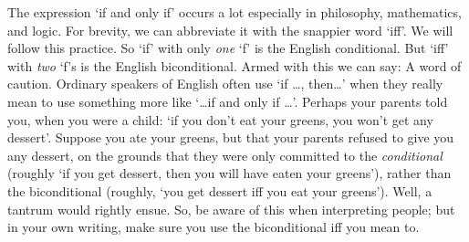 The expression `if and only if' occurs a lot especially in philosophy, mathematics, and logic. For brevity, we can abbreviate it with the snappier word `iff'. We will follow this practice. So `if' with only \emph{one} `f' is the English conditional. But `iff' with \emph{two} `f's is the English biconditional. Armed with this we can say:
A word of caution. Ordinary speakers of English often use `if \ldots, then\ldots' when they really mean to use something more like `\ldots if and only if \ldots'. Perhaps your parents told you, when you were a child: `if you don't eat your greens, you won't get any dessert'. Suppose you ate your greens, but that your parents refused to give you any dessert, on the grounds that they were only committed to the \emph{conditional} (roughly `if you get dessert, then you will have eaten your greens'), rather than the biconditional (roughly, `you get dessert iff you eat your greens'). Well, a tantrum would rightly ensue. So, be aware of this when interpreting people; but in your own writing, make sure you use the biconditional iff you mean to.

\practiceproblems
\solutions

